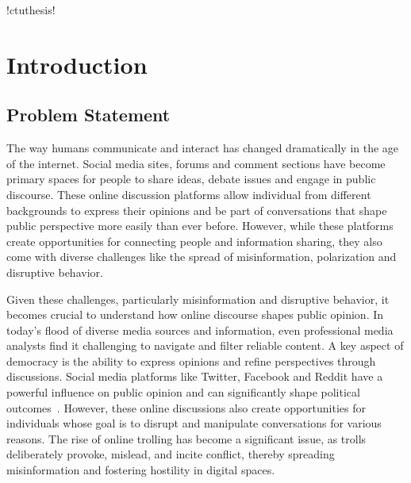 \documentclass[twoside]{ctuthesis}
\theoremstyle{plain}
\theoremstyle{definition}
\theoremstyle{note}
\begin{document}
\renewcommand \ctulstsep{0pt}

\newcommand\ctuclsname{\leavevmode\unhcopy\ctuclsnamebox}
\newsavebox\ctuclsnamebox
\begin{lrbox}{\ctuclsnamebox}
\ctulst!ctuthesis!
\end{lrbox}

\maketitle

\chapter{Introduction}

\section{Problem Statement}
\par
The way humans communicate and interact has changed dramatically in the age of the internet. Social media sites, forums and comment sections have become primary spaces for people to share ideas, debate issues and engage in public discourse. These online discussion platforms allow individual from different backgrounds to express their opinions and be part of conversations that shape public perspective more easily than ever before. However, while these platforms create opportunities for connecting people and information sharing, they also come with diverse challenges like the spread of misinformation, polarization and disruptive behavior.\par

Given these challenges, particularly misinformation and disruptive behavior, it becomes crucial to understand how online discourse shapes public opinion. In today’s flood of diverse media sources and information, even professional media analysts find it challenging to navigate and filter reliable content. A key aspect of democracy is the ability to express opinions and refine perspectives through discussions. Social media platforms like Twitter, Facebook and Reddit have a powerful influence on public opinion and can significantly shape political outcomes~\cite{Bennett2012DigitalMedia}. However, these online discussions also create opportunities for individuals whose goal is to disrupt and manipulate conversations for various reasons. The rise of online trolling has become a significant issue, as trolls deliberately provoke, mislead, and incite conflict, thereby spreading misinformation and fostering hostility in digital spaces.\par
\end{document}
